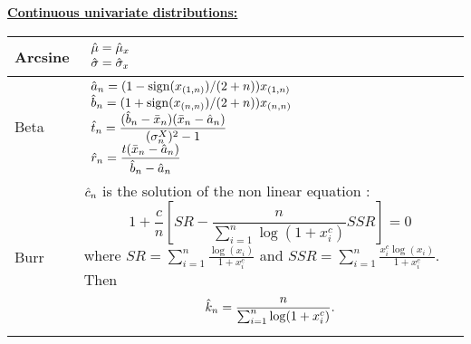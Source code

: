 {  \underline{\textbf{Continuous univariate distributions:}}\\

  \begin{tabular}{|l|p{12cm}|}
    \hline
    Arcsine & $\begin{array}{l}
      \displaystyle\Hat{\mu} = \Hat{\mu}_x\\
      \displaystyle\Hat{\sigma} = \Hat{\sigma}_x\\
    \end{array}$\\
    \hline
    Beta & $\begin{array}{l}
      \displaystyle\Hat{a}_n=(1-\mathrm{sign}(x_{(1,n)})/(2+n))x_{(1,n)}\\
      \displaystyle\Hat{b}_n=(1+\mathrm{sign}(x_{(n,n)})/(2+n))x_{(n,n)}\\
      \displaystyle\Hat{t}_n=\frac{(\Hat{b}_n-\bar{x}_n)(\bar{x}_n-\Hat{a}_n)}{(\sigma_n^X)^2-1}\\
      \displaystyle\Hat{r}_n=\frac{t(\bar{x}_n-\Hat{a}_n)}{\Hat{b}_n-\Hat{a}_n}
    \end{array}$\\
    \hline
    Burr & $\Hat{c}_n$ is the solution of the non linear equation : 
$$
\displaystyle 1+\frac{c}{n}\left[ SR - \frac{n}{\sum_{i=1}^n \log(1+x_i^c)}SSR\right] = 0
$$
where $ \displaystyle SR = \displaystyle \sum_{i=1}^n \frac{ \log(x_i)}{1+x_i^c}$ and $ \displaystyle SSR = \displaystyle \sum_{i=1}^n \frac{ x_i^c\log(x_i)}{1+x_i^c}$.
Then 
$$\Hat{k}_n =  \frac{n}{\sum_{i=1}^n \log(1+x_i^c)}.
$$


\\
    \hline
  \end{tabular}

}
